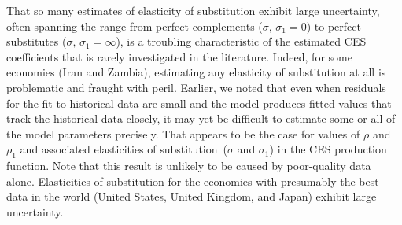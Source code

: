 \documentclass[preprint,authoryear,12pt]{elsarticle}\usepackage[]{graphicx}\usepackage[]{color}
\begin{document}
That so many estimates of elasticity of substitution exhibit large uncertainty, 
often spanning the range from perfect complements ($\sigma, \, \sigma_1 = 0$) 
to perfect substitutes ($\sigma, \, \sigma_1 = \infty$), 
is a troubling characteristic of the estimated CES coefficients 
that is rarely investigated in the literature.
Indeed, for some economies (Iran and Zambia), 
estimating any elasticity of substitution at all is problematic and fraught with peril. 
Earlier, we noted that 
even when residuals for the fit to historical data are small 
and the model produces fitted values that track the historical data closely, 
it may yet be difficult to estimate some or all of the model parameters precisely.
That appears to be the case for 
values of $\rho$ and $\rho_1$ and associated
elasticities of substitution~($\sigma$ and $\sigma_1$)
in the CES production function.
Note that this result is unlikely to be caused by poor-quality data alone. 
Elasticities of substitution for the economies with presumably the best data in the world 
(United States, United Kingdom, and Japan) exhibit large uncertainty. 
\end{document}
